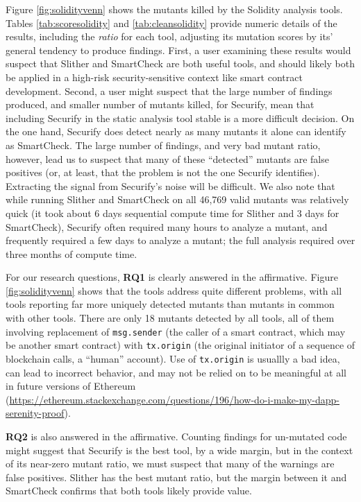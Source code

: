 Figure \ref{fig:solidityvenn} shows the mutants killed by the Solidity analysis tools.  Tables \ref{tab:scoresolidity} and \ref{tab:cleansolidity} provide numeric details of the results, including the \emph{ratio} for each tool, adjusting its mutation scores by its' general tendency to produce findings.  First, a user examining these results would suspect that Slither and SmartCheck are both useful tools, and should likely both be applied in a high-risk security-sensitive context like smart contract development.  Second, a user might suspect that the large number of findings produced, and smaller number of mutants killed, for Securify, mean that including Securify in the static analysis tool stable is a more difficult decision.  On the one hand, Securify does detect nearly as many mutants it alone can identify as SmartCheck.  The large number of findings, and very bad mutant ratio, however, lead us to suspect that many of these ``detected'' mutants are false positives (or, at least, that the problem is not the one Securify identifies).  Extracting the signal from Securify's noise will be difficult.  We also note that while running Slither and SmartCheck on all 46,769 valid mutants was relatively quick (it took about 6 days sequential compute time for Slither and 3 days for SmartCheck), Securify often required many hours to analyze a mutant, and frequently required a few days to analyze a mutant; the full analysis required over three months of compute time.

For our research questions, {\bf RQ1} is clearly answered in the affirmative.  Figure \ref{fig:solidityvenn} shows that the tools address quite different problems, with all tools reporting far more uniquely detected mutants than mutants in common with other tools.  There are only 18 mutants detected by all tools, all of them involving replacement of {\tt msg.sender} (the caller of a smart contract, which may be another smart contract) with {\tt tx.origin} (the original initiator of a sequence of blockchain calls, a ``human'' account).  Use of {\tt tx.origin} is usuallly a bad idea, can lead to incorrect behavior, and may not be relied on to be meaningful at all in future versions of Ethereum (\url{https://ethereum.stackexchange.com/questions/196/how-do-i-make-my-dapp-serenity-proof}).  

{\bf RQ2} is also answered in the affirmative.  Counting findings for un-mutated code might suggest that Securify is the best tool, by a wide margin, but in the context of its near-zero mutant ratio, we must suspect that many of the warnings are false positives.  Slither has the best mutant ratio, but the margin between it and SmartCheck confirms that both tools likely provide value.

